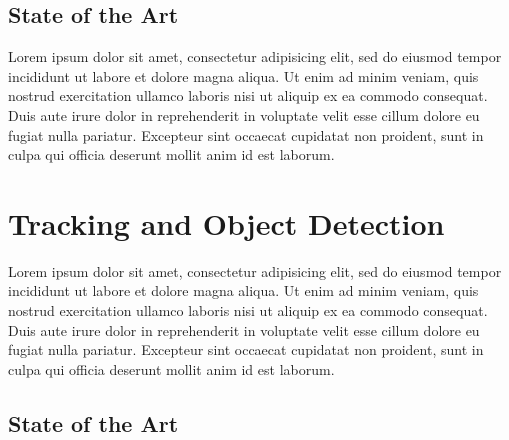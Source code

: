 \subsection{State of the Art} %
\label{sub:basic_concepts:augmented_reality:state_of_the_art}

Lorem ipsum dolor sit amet, consectetur adipisicing elit, sed do eiusmod
tempor incididunt ut labore et dolore magna aliqua. Ut enim ad minim veniam,
quis nostrud exercitation ullamco laboris nisi ut aliquip ex ea commodo
consequat. Duis aute irure dolor in reprehenderit in voluptate velit esse
cillum dolore eu fugiat nulla pariatur. Excepteur sint occaecat cupidatat non
proident, sunt in culpa qui officia deserunt mollit anim id est laborum.



\section{Tracking and Object Detection} %
\label{sec:basic_concepts:tracking}

Lorem ipsum dolor sit amet, consectetur adipisicing elit, sed do eiusmod
tempor incididunt ut labore et dolore magna aliqua. Ut enim ad minim veniam,
quis nostrud exercitation ullamco laboris nisi ut aliquip ex ea commodo
consequat. Duis aute irure dolor in reprehenderit in voluptate velit esse
cillum dolore eu fugiat nulla pariatur. Excepteur sint occaecat cupidatat non
proident, sunt in culpa qui officia deserunt mollit anim id est laborum.

\subsection{State of the Art} %
\label{sub:basic_concepts:tracking:state_of_the_art}



